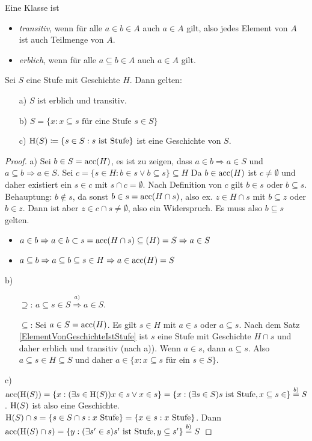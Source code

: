 \begin{definition} 
	Eine Klasse ist
	\begin{itemize}
		\item \textit{transitiv}, wenn für alle $a\in b\in A$ auch $a\in A$ gilt, also jedes Element von $A$ ist auch Teilmenge von $A$.
		\item \textit{erblich}, wenn für alle $a\subseteq b \in A$ auch $a\in A$ gilt.
	\end{itemize}
\end{definition}

\begin{satz}
	Sei $S$ eine Stufe mit Geschichte $H$. Dann gelten:
	\begin{itemize}
		\item[a)] $S$ ist erblich und transitiv.
		\item[b)] $S=\{x : x\subseteq s \text{ für eine Stufe } s\in S\}$
		\item[c)] $\operatorname{H}(S)\coloneqq\{s\in S : s\text{ ist Stufe}\}$ ist eine Geschichte von $S$.
	\end{itemize}
\end{satz}
\begin{proof}
	a) Sei $b\in S=\operatorname{acc}(H)$, es ist zu zeigen, dass $a\in b\Rightarrow a\in S$ und $a\subseteq b \Rightarrow a\in S$. Sei $c=\{s\in H : b\in s \lor b \subseteq s\}\subseteq H$ Da $b\in \operatorname{acc}(H)$ ist $c\neq \emptyset$ und daher existiert ein $s\in c$ mit $s\cap c=\emptyset$. Nach Definition von $c$ gilt $b\in s$ oder $b\subseteq s$. 
	\\
	Behauptung: $b\notin s$, da sonst $b\in s = \operatorname{acc}(H\cap s)$, also ex. $z\in H\cap s$ mit $b\subseteq z$ oder $b\in z$. Dann ist aber $z\in c\cap s\neq \emptyset$, also ein Widerspruch. Es muss also $b\subseteq s$ gelten. 
	\begin{itemize}
		\item $a\in b \Rightarrow a \in b \subset s=\operatorname{acc}(H\cap s)\subseteq(H)=S\Rightarrow a\in S$
		\item $a\subseteq b\Rightarrow a\subseteq b \subseteq s\in H \Rightarrow a\in \operatorname{acc}(H)=S$
	\end{itemize}
	b)
	\begin{itemize}
		\item[$\supseteq$:] $a\subseteq s \in S\stackrel{a)}{\Rightarrow}a\in S.$
		\item[$\subseteq$:] Sei $a\in S=\operatorname{acc}(H)$. Es gilt $s\in H$ mit $a\in s$ oder $a\subseteq s$. Nach dem Satz \ref{ElementVonGeschichteIstStufe} ist $s$ eine Stufe mit Geschichte $H\cap s$ und daher erblich und transitiv (nach a)). Wenn $a\in s$, dann $a\subseteq s$. Also $a\subseteq s\in H\subseteq S$ und daher $a\in\{x : x\subseteq s \text{ für ein } s\in S\}$.
	\end{itemize}
	c) $\operatorname{acc}(\operatorname{H}(S))=\{x : (\exists s\in \operatorname{H}(S)) x\in s \lor x\in s\} = \{x : (\exists s \in S) s \text{ ist Stufe}, x\subseteq s\in\}\stackrel{b)}{=}S$. 
	$\operatorname{H}(S)$ ist also eine Geschichte. 
	$\operatorname{H}(S)\cap s=\{s\in S\cap s : x \text{ Stufe}\}=\{x\in s : x \text{ Stufe}\}$. Dann $\operatorname{acc}(\operatorname{H}(S)\cap s)=\{y : (\exists s'\in s) s' \text{ ist Stufe}, y\subseteq s'\}\stackrel{b)}{=}S$
\end{proof}
